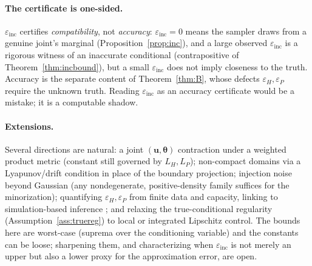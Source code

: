 \documentclass[11pt]{article}
\theoremstyle{plain}
\theoremstyle{definition}
\theoremstyle{remark}
\newcommand{\bth}{\bm{\theta}}
\newcommand{\bu}{\bm{u}}
\newcommand{\einc}{\varepsilon_{\mathrm{inc}}}
\begin{document}
\paragraph{The certificate is one-sided.} $\einc$ certifies \emph{compatibility}, not \emph{accuracy}:
$\einc=0$ means the sampler draws from a genuine joint's marginal (Proposition~\ref{prop:inc}), and a
large observed $\einc$ is a rigorous witness of an inaccurate conditional (contrapositive of
Theorem~\ref{thm:incbound}), but a small $\einc$ does not imply closeness to the truth. Accuracy is the
separate content of Theorem~\ref{thm:B}, whose defects $\varepsilon_H,\varepsilon_P$ require the
unknown truth. Reading $\einc$ as an accuracy certificate would be a mistake; it is a computable shadow.

\paragraph{Extensions.} Several directions are natural: a joint $(\bu,\bth)$ contraction under a
weighted product metric (constant still governed by $L_H,L_P$); non-compact domains via a
Lyapunov/drift condition in place of the boundary projection; injection noise beyond Gaussian
(any nondegenerate, positive-density family suffices for the minorization); quantifying
$\varepsilon_H,\varepsilon_P$ from finite data and capacity, linking to simulation-based inference
\citep{papamakarios2016,cranmer2020}; and relaxing the true-conditional regularity
(Assumption~\ref{ass:truereg}) to local or integrated Lipschitz control. The bounds here are
worst-case (suprema over the conditioning variable) and the constants can be loose; sharpening them,
and characterizing when $\einc$ is not merely an upper but also a lower proxy for the approximation
error, are open.
\end{document}
